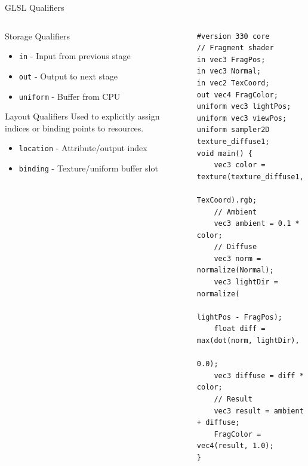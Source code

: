 \begin{frame}[fragile]{GLSL Qualifiers}
  \begin{columns}
    \begin{column}{0.5\textwidth}
      \begin{conceptbox}{Storage Qualifiers}
        \footnotesize
        \begin{itemize}
          \item \texttt{\textcolor{PrimaryColor}{in}} - Input from previous stage
          \item \texttt{\textcolor{SecondaryColor}{out}} - Output to next stage
          \item \texttt{\textcolor{ObjectColor}{uniform}} - Buffer from CPU
        \end{itemize}
      \end{conceptbox}

      \begin{mathbox}{Layout Qualifiers}
        \footnotesize
        Used to explicitly assign indices or binding points to resources.
        \begin{itemize}
          \item \texttt{location} - Attribute/output index
          \item \texttt{binding} - Texture/uniform buffer slot
        \end{itemize}
      \end{mathbox}
    \end{column}
    \begin{column}{0.5\textwidth}
      \begin{verbatim}
#version 330 core
// Fragment shader
in vec3 FragPos;
in vec3 Normal;
in vec2 TexCoord;
out vec4 FragColor;
uniform vec3 lightPos;
uniform vec3 viewPos;
uniform sampler2D texture_diffuse1;
void main() {
    vec3 color = texture(texture_diffuse1,
                          TexCoord).rgb;
    // Ambient
    vec3 ambient = 0.1 * color;
    // Diffuse
    vec3 norm = normalize(Normal);
    vec3 lightDir = normalize(
                      lightPos - FragPos);
    float diff = max(dot(norm, lightDir),
                      0.0);
    vec3 diffuse = diff * color;
    // Result
    vec3 result = ambient + diffuse;
    FragColor = vec4(result, 1.0);
}
      \end{verbatim}
    \end{column}
  \end{columns}
\end{frame}
